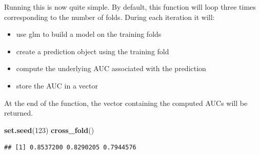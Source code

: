 \documentclass[
]{book}
\newenvironment{Shaded}{\begin{snugshade}}{\end{snugshade}}
\newcommand{\CommentTok}[1]{\textcolor[rgb]{0.56,0.35,0.01}{\textit{#1}}}
\newcommand{\DataTypeTok}[1]{\textcolor[rgb]{0.13,0.29,0.53}{#1}}
\newcommand{\DecValTok}[1]{\textcolor[rgb]{0.00,0.00,0.81}{#1}}
\newcommand{\KeywordTok}[1]{\textcolor[rgb]{0.13,0.29,0.53}{\textbf{#1}}}
\newcommand{\NormalTok}[1]{#1}
\newcommand{\OperatorTok}[1]{\textcolor[rgb]{0.81,0.36,0.00}{\textbf{#1}}}
\newcommand{\StringTok}[1]{\textcolor[rgb]{0.31,0.60,0.02}{#1}}
\providecommand{\tightlist}{%
  \setlength{\itemsep}{0pt}\setlength{\parskip}{0pt}}
\begin{document}
\begin{Shaded}
\end{Shaded}

Running this is now quite simple. By default, this function will loop three times corresponding to the number of folds. During each iteration it will:

\begin{itemize}
\tightlist
\item
  use glm to build a model on the training folds
\item
  create a prediction object using the training fold
\item
  compute the underlying AUC associated with the prediction
\item
  store the AUC in a vector
\end{itemize}

At the end of the function, the vector containing the computed AUCs will be returned.

\begin{Shaded}
\begin{Highlighting}[]
\KeywordTok{set.seed}\NormalTok{(}\DecValTok{123}\NormalTok{)}
\KeywordTok{cross_fold}\NormalTok{()}
\end{Highlighting}
\end{Shaded}

\begin{verbatim}
## [1] 0.8537200 0.8290205 0.7944576
\end{verbatim}
\end{document}
